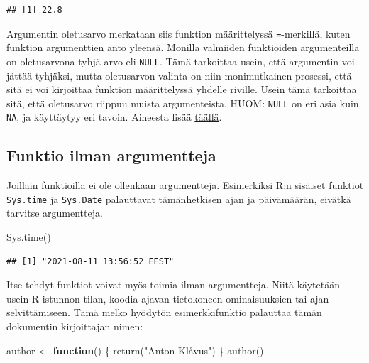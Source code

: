 \documentclass[
]{book}
\newenvironment{Shaded}{\begin{snugshade}}{\end{snugshade}}
\newcommand{\ControlFlowTok}[1]{\textcolor[rgb]{0.13,0.29,0.53}{\textbf{#1}}}
\newcommand{\FunctionTok}[1]{\textcolor[rgb]{0.00,0.00,0.00}{#1}}
\newcommand{\NormalTok}[1]{#1}
\newcommand{\OtherTok}[1]{\textcolor[rgb]{0.56,0.35,0.01}{#1}}
\newcommand{\StringTok}[1]{\textcolor[rgb]{0.31,0.60,0.02}{#1}}
\begin{document}
\begin{verbatim}
## [1] 22.8
\end{verbatim}

Argumentin oletusarvo merkataan siis funktion määrittelyssä \texttt{=}-merkillä, kuten funktion argumenttien anto yleensä. Monilla valmiiden funktioiden argumenteilla on oletusarvona tyhjä arvo eli \texttt{NULL}. Tämä tarkoittaa usein, että argumentin voi jättää tyhjäksi, mutta oletusarvon valinta on niin monimutkainen prosessi, että sitä ei voi kirjoittaa funktion määrittelyssä yhdelle riville. Usein tämä tarkoittaa sitä, että oletusarvo riippuu muista argumenteista. HUOM: \texttt{NULL} on eri asia kuin \texttt{NA}, ja käyttäytyy eri tavoin. Aiheesta lisää \href{https://www.r-bloggers.com/r-na-vs-null/}{täällä}.

\hypertarget{funktio-ilman-argumentteja}{%
\subsection{Funktio ilman argumentteja}\label{funktio-ilman-argumentteja}}

Joillain funktioilla ei ole ollenkaan argumentteja. Esimerkiksi R:n sisäiset funktiot \texttt{Sys.time} ja \texttt{Sys.Date} palauttavat tämänhetkisen ajan ja päivämäärän, eivätkä tarvitse argumentteja.

\begin{Shaded}
\begin{Highlighting}[]
\FunctionTok{Sys.time}\NormalTok{()}
\end{Highlighting}
\end{Shaded}

\begin{verbatim}
## [1] "2021-08-11 13:56:52 EEST"
\end{verbatim}

Itse tehdyt funktiot voivat myös toimia ilman argumentteja. Niitä käytetään usein R-istunnon tilan, koodia ajavan tietokoneen ominaisuuksien tai ajan selvittämiseen. Tämä melko hyödytön esimerkkifunktio palauttaa tämän dokumentin kirjoittajan nimen:

\begin{Shaded}
\begin{Highlighting}[]
\NormalTok{author }\OtherTok{\textless{}{-}} \ControlFlowTok{function}\NormalTok{() \{}
  \FunctionTok{return}\NormalTok{(}\StringTok{"Anton Klåvus"}\NormalTok{)}
\NormalTok{\}}
\FunctionTok{author}\NormalTok{()}
\end{Highlighting}
\end{Shaded}
\end{document}

